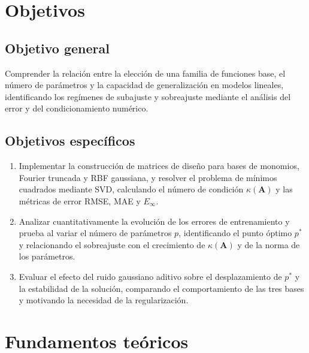 \section*{Objetivos}

\subsection*{Objetivo general}
Comprender la relación entre la elección de una familia de funciones base, el número de parámetros y la capacidad de generalización en modelos lineales, identificando los regímenes de subajuste y sobreajuste mediante el análisis del error y del condicionamiento numérico.

\subsection*{Objetivos específicos}
\begin{enumerate}[leftmargin=2em, label=\arabic*.]
  \item Implementar la construcción de matrices de diseño para bases de monomios, Fourier truncada y RBF gaussiana, y resolver el problema de mínimos cuadrados mediante SVD, calculando el número de condición \(\kappa(\mathbf{A})\) y las métricas de error RMSE, MAE y \(E_\infty\).
  \item Analizar cuantitativamente la evolución de los errores de entrenamiento y prueba al variar el número de parámetros \(p\), identificando el punto óptimo \(p^*\) y relacionando el sobreajuste con el crecimiento de \(\kappa(\mathbf{A})\) y de la norma de los parámetros.
  \item Evaluar el efecto del ruido gaussiano aditivo sobre el desplazamiento de \(p^*\) y la estabilidad de la solución, comparando el comportamiento de las tres bases y motivando la necesidad de la regularización.
\end{enumerate}

\section*{Fundamentos teóricos}
\label{sec:teoria}

